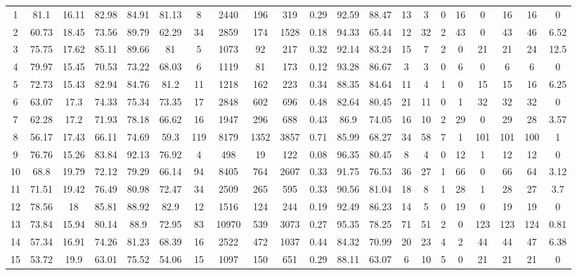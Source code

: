 \begin{landscape}
\begin{table}[!htb]
{\begin{tabular}{|c|c|c|c|c|c|c|c|c|c|c|c|c|c|c|c|c|c|c|c|c|}
    1 & 81.1 & 16.11 & 82.98 & 84.91 & 81.13 & 8 & 2440 & 196 & 319 & 0.29 & 92.59 & 88.47 & 13 & 3 & 0 & 16 & 0 & 16 & 16 & 0 \\
    \rowcolor{gray!10}
    2 & 60.73 & 18.45 & 73.56 & 89.79 & 62.29 & 34 & 2859 & 174 & 1528 & 0.18 & 94.33 & 65.44 & 12 & 32 & 2 & 43 & 0 & 43 & 46 & 6.52 \\
    3 & 75.75 & 17.62 & 85.11 & 89.66 & 81 & 5 & 1073 & 92 & 217 & 0.32 & 92.14 & 83.24 & 15 & 7 & 2 & 0 & 21 & 21 & 24 & 12.5 \\
    \rowcolor{gray!10}
    4 & 79.97 & 15.45 & 70.53 & 73.22 & 68.03 & 6 & 1119 & 81 & 173 & 0.12 & 93.28 & 86.67 & 3 & 3 & 0 & 6 & 0 & 6 & 6 & 0 \\
    5 & 72.73 & 15.43 & 82.94 & 84.76 & 81.2 & 11 & 1218 & 162 & 223 & 0.34 & 88.35 & 84.64 & 11 & 4 & 1 & 0 & 15 & 15 & 16 & 6.25 \\
    \rowcolor{gray!10}
    6 & 63.07 & 17.3 & 74.33 & 75.34 & 73.35 & 17 & 2848 & 602 & 696 & 0.48 & 82.64 & 80.45 & 21 & 11 & 0 & 1 & 32 & 32 & 32 & 0 \\
    7 & 62.28 & 17.2 & 71.93 & 78.18 & 66.62 & 16 & 1947 & 296 & 688 & 0.43 & 86.9 & 74.05 & 16 & 10 & 2 & 29 & 0 & 29 & 28 & 3.57 \\
    \rowcolor{gray!10}
    8 & 56.17 & 17.43 & 66.11 & 74.69 & 59.3 & 119 & 8179 & 1352 & 3857 & 0.71 & 85.99 & 68.27 & 34 & 58 & 7 & 1 & 101 & 101 & 100 & 1 \\
    9 & 76.76 & 15.26 & 83.84 & 92.13 & 76.92 & 4 & 498 & 19 & 122 & 0.08 & 96.35 & 80.45 & 8 & 4 & 0 & 12 & 1 & 12 & 12 & 0 \\
    \rowcolor{gray!10}
    10 & 68.8 & 19.79 & 72.12 & 79.29 & 66.14 & 94 & 8405 & 764 & 2607 & 0.33 & 91.75 & 76.53 & 36 & 27 & 1 & 66 & 0 & 66 & 64 & 3.12 \\
    11 & 71.51 & 19.42 & 76.49 & 80.98 & 72.47 & 34 & 2509 & 265 & 595 & 0.33 & 90.56 & 81.04 & 18 & 8 & 1 & 28 & 1 & 28 & 27 & 3.7 \\
    \rowcolor{gray!10}
    12 & 78.56 & 18 & 85.81 & 88.92 & 82.9 & 12 & 1516 & 124 & 244 & 0.19 & 92.49 & 86.23 & 14 & 5 & 0 & 19 & 0 & 19 & 19 & 0 \\
    13 & 73.84 & 15.94 & 80.14 & 88.9 & 72.95 & 83 & 10970 & 539 & 3073 & 0.27 & 95.35 & 78.25 & 71 & 51 & 2 & 0 & 123 & 123 & 124 & 0.81 \\
    \rowcolor{gray!10}
    14 & 57.34 & 16.91 & 74.26 & 81.23 & 68.39 & 16 & 2522 & 472 & 1037 & 0.44 & 84.32 & 70.99 & 20 & 23 & 4 & 2 & 44 & 44 & 47 & 6.38 \\
    15 & 53.72 & 19.9 & 63.01 & 75.52 & 54.06 & 15 & 1097 & 150 & 651 & 0.29 & 88.11 & 63.07 & 6 & 10 & 5 & 0 & 21 & 21 & 21 & 0 \\

\end{tabular}}
\end{table}
\end{landscape}
